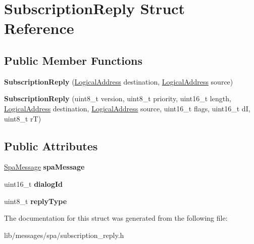 \hypertarget{structSubscriptionReply}{}\section{Subscription\+Reply Struct Reference}
\label{structSubscriptionReply}
\subsection*{Public Member Functions}
\begin{DoxyCompactItemize}
\item 
\mbox{\label{structSubscriptionReply_a8b41ba60bc85ee15f7bddbaec3260ad0}} 
{\bfseries Subscription\+Reply} (\hyperlink{structLogicalAddress}{Logical\+Address} destination, \hyperlink{structLogicalAddress}{Logical\+Address} source)
\item 
\mbox{\label{structSubscriptionReply_a8e656028ab7b6750157b6d0ebbf06659}} 
{\bfseries Subscription\+Reply} (uint8\+\_\+t version, uint8\+\_\+t priority, uint16\+\_\+t length, \hyperlink{structLogicalAddress}{Logical\+Address} destination, \hyperlink{structLogicalAddress}{Logical\+Address} source, uint16\+\_\+t flags, uint16\+\_\+t dI, uint8\+\_\+t rT)
\end{DoxyCompactItemize}
\subsection*{Public Attributes}
\begin{DoxyCompactItemize}
\item 
\mbox{\label{structSubscriptionReply_a4e4c24f7a85c8c2ac00604e9edf0bbab}} 
\hyperlink{structSpaMessage}{Spa\+Message} {\bfseries spa\+Message}
\item 
\mbox{\label{structSubscriptionReply_a8fc1a335af866ee6e1328106421fee66}} 
uint16\+\_\+t {\bfseries dialog\+Id}
\item 
\mbox{\label{structSubscriptionReply_a289965f913a0dac7204482b86798ed5a}} 
uint8\+\_\+t {\bfseries reply\+Type}
\end{DoxyCompactItemize}


The documentation for this struct was generated from the following file\+:\begin{DoxyCompactItemize}
\item 
lib/messages/spa/subscription\+\_\+reply.\+h\end{DoxyCompactItemize}
